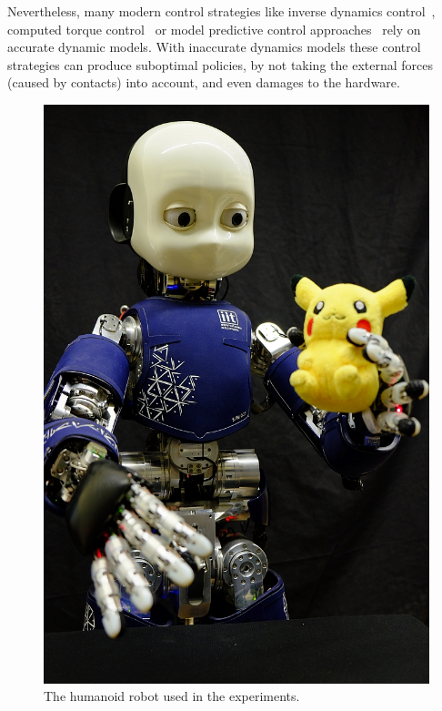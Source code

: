 Nevertheless, many modern control strategies like inverse dynamics control~\cite{Erez2012}, computed torque control~\cite{Siciliano2009} or model predictive control approaches~\cite{Naveau2014} rely on accurate dynamic models.
With inaccurate dynamics models these control strategies can produce suboptimal policies, by not taking the external forces (caused by contacts) into account, and even damages to the hardware.


\begin{figure}
	\vspace{-10pt}
	\centering
	\includegraphics[width=.999\linewidth]{robertoIROS/fig/iCubDarmstadt01_new}
	\caption{The humanoid robot \robot{} used in the experiments.}
    \vspace{-10pt}
	\label{fig:robIROS_icub}
\end{figure}
